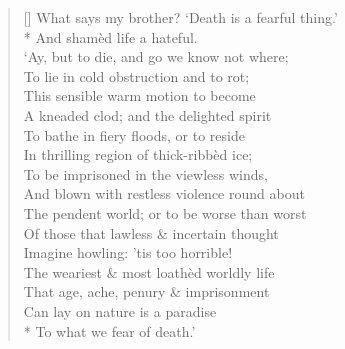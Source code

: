 \documentclass[MAIN]{subfiles}
\begin{document}
\settowidth{\versewidth}{The pendent world; or to be worse than worst}
\begin{verse}[\versewidth]
What says my brother? `Death is a fearful thing.'\\*
And sham\`ed life a hateful.\\
`Ay, but to die, and go we know not where;\\
To lie in cold obstruction and to rot;\\
This sensible warm motion to become\\
A kneaded clod; and the delighted spirit\\
To bathe in fiery floods, or to reside\\
In thrilling region of thick-ribb\`ed ice;\\
To be imprisoned in the viewless winds,\\
And blown with restless violence round about\\
The pendent world; or to be worse than worst\\
Of those that lawless \& incertain thought\\
Imagine howling: 'tis too horrible!\\
The weariest \& most loath\`ed worldly life\\
That age, ache, penury \& imprisonment\\
Can lay on nature is a paradise\\*
To what we fear of death.'
\end{verse}
\end{document}
